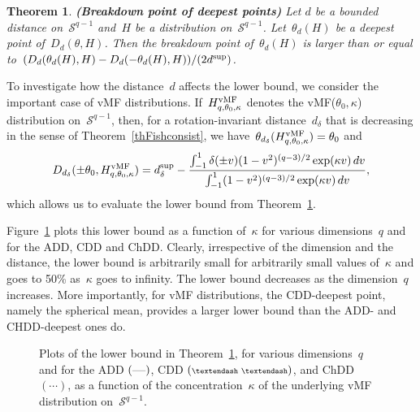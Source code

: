 \documentclass[usenames,dvipsnames]{article}
\newtheorem{thm}{Theorem}
\begin{document}
\begin{thm}{\textbf{(Breakdown point of deepest points)}}
\label{thmbdp}
Let $d$ be a bounded distance on~$\mathcal{S}^{q-1}$ and~$H$ be a distribution on~$\mathcal{S}^{q-1}$. Let~$\theta_d(H)$ be a deepest point of~$D_{d}(\theta,H)$. Then the breakdown point of~$\theta_d(H)$ is larger than or equal to~$(D_{d}(\theta_d(H),H) - D_{d}(-\theta_d(H),H))\linebreak/(2d^{\rm sup})$.
\end{thm}

To investigate how the distance~$d$ affects the lower bound, we consider the important case of vMF distributions. If~$H^{\rm vMF}_{q,\theta_0,\kappa}$ denotes the vMF($\theta_0,\kappa$) distribution on~$\mathcal{S}^{q-1}$, then, for a rotation-invariant distance~$d_\delta$ that is decreasing in the sense of Theorem~\ref{thFishconsist}, we have~$\theta_{d_\delta}(H^{\rm vMF}_{q,\theta_0,\kappa})=\theta_0$ and  
$$
D_{d_\delta}(\pm\theta_0,H^{\rm vMF}_{q,\theta_0,\kappa})
=
d^{\rm sup}_\delta
-
\frac{ 
\int_{-1}^1
\delta(\pm v)
(1-v^2)^{(q-3)/2}
\exp(\kappa v) 
\,
dv
}
{\int_{-1}^1
(1-v^2)^{(q-3)/2}
\exp(\kappa v) 
\,
dv
} 
,
$$
which allows us to evaluate the lower bound from Theorem~\ref{thmbdp}. 

Figure~\ref{BDPfig} plots this lower bound as a function of~$\kappa$ for various dimensions~$q$ and for the ADD, CDD and ChDD. Clearly, irrespective of the dimension and the distance, the lower bound is arbitrarily small for arbitrarily small values of~$\kappa$ and goes to 50\% as~$\kappa$ goes to infinity. The lower bound decreases as the dimension~$q$ increases. More importantly, for vMF distributions, the CDD-deepest point, namely the spherical mean,
provides a larger lower bound than the ADD- and CHDD-deepest ones do.
\begin{figure}[h!]
\captionsetup{font=scriptsize}
\begin{center} 
\end{center}
\vspace{-1em}
\caption{Plots of the lower bound in Theorem~\ref{thmbdp}, for various dimensions~$q$ and for the ADD $(\rule[0.5ex]{0.4cm}{0.2pt})$, CDD $(\scriptsize\textendash\ \textendash)$, and ChDD $(\cdots)$, as a function of the concentration~$\kappa$ of the underlying vMF distribution on~$\mathcal{S}^{q-1}$.}
\label{BDPfig}
\end{figure}
\end{document}
